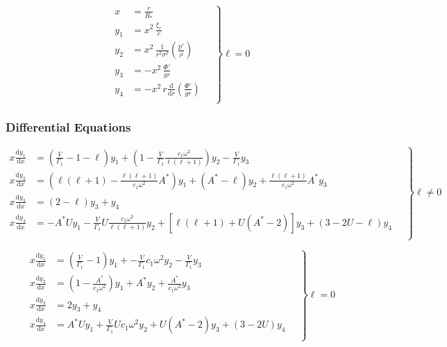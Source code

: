 \documentclass[fleqn]{article}
\newcommand{\diff}{\ensuremath{\mathrm{d}}}
\newcommand{\Vg}{\ensuremath{\frac{V}{\Gamma_{1}}}}
\newcommand{\As}{\ensuremath{A^{\ast}}}
\newcommand{\Rstar}{\ensuremath{R_{\ast}}}
\begin{document}
\begin{equation*}
\left.
\begin{aligned}
x     &= \frac{r}{\Rstar} \\
y_{1} &= x^{2}\, \frac{\xi_{r}}{r} \\
y_{2} &= x^{2}\, \frac{1}{r^{2} \sigma^{2}} \left( \frac{p'}{\rho} \right) \\
y_{3} &= - x^{2}\, \frac{\Phi'}{gr} \\
y_{4} &= - x^{2}\, r \frac{\diff}{\diff r} \left( \frac{\Phi'}{g r} \right) \\
\end{aligned}
\quad \right\} \ell = 0
\end{equation*}

\subsubsection*{Differential Equations}

\begin{equation*}
\left.
\begin{aligned}
x \frac{\diff y_{1}}{\diff x} &=
\left(\Vg - 1 - \ell \right) y_{1} +
\left(1 - \Vg \frac{c_{1} \omega^{2}}{\ell(\ell+1)} \right) y_{2} -
\Vg y_{3} \\
x \frac{\diff y_{2}}{\diff x} &=
\left( \ell(\ell+1) - \frac{\ell(\ell+1)}{c_{1} \omega^{2}} \As \right) y_{1} +
(\As - \ell) y_{2} +
\frac{\ell(\ell+1)}{c_{1} \omega^{2}} \As y_{3} \\
x \frac{\diff y_{3}}{\diff x} &=
(2 - \ell) y_{3} + y_{4} \\
x \frac{\diff y_{4}}{\diff x} &=
- \As U y_{1} 
- \Vg U \frac{c_{1} \omega^{2}}{\ell(\ell+1)} y_{2} +
\left[ \ell(\ell+1) + U(\As - 2) \right] y_{3} +
( 3 - 2U - \ell ) y_{4} \\
\end{aligned}
\quad \right\} \ell \neq 0
\end{equation*}

\begin{equation*}
\left.
\begin{aligned}
x \frac{\diff y_{1}}{\diff x} &=
\left(\Vg - 1 \right) y_{1} +
- \Vg c_{1} \omega^{2} y_{2} -
\Vg y_{3} \\
x \frac{\diff y_{2}}{\diff x} &=
(1 - \frac{\As}{c_{1} \omega^{2}} ) y_{1} +
\As y_{2} +
\frac{\As}{c_{1} \omega^{2}} y_{3} \\
x \frac{\diff y_{3}}{\diff x} &=
2 y_{3} + y_{4} \\
x \frac{\diff y_{4}}{\diff x} &=
\As U y_{1} +
\Vg U c_{1} \omega^{2} y_{2} +
U (\As - 2) y_{3} +
(3 - 2 U) y_{4} \\
\end{aligned}
\quad \right\} \ell = 0
\end{equation*}
\end{document}
